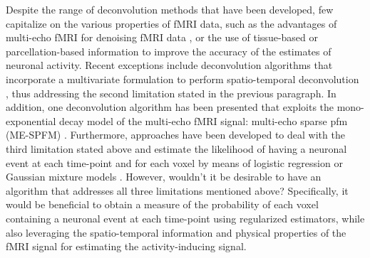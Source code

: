 Despite the range of deconvolution methods that have been developed, few
capitalize on the various properties of fMRI data, such as the advantages of
multi-echo fMRI for denoising fMRI data
\citep{Bright2013Removingmotionphysiological, Kundu2017MultiechofMRI}, or the
use of tissue-based or parcellation-based information to improve the accuracy of
the estimates of neuronal activity. Recent exceptions include deconvolution
algorithms that incorporate a multivariate formulation to perform
spatio-temporal deconvolution
\citep{Bolton2019StructurallyInformedDeconvolution,Urunuela2021LowRankSparse,
Costantini2022Anisotropic4DFiltering,Cherkaoui2021Multivariatesemiblind}, thus
addressing the second limitation stated in the previous paragraph. In addition,
one deconvolution algorithm has been presented that exploits the
mono-exponential decay model of the multi-echo fMRI signal: multi-echo sparse
\acrlong*{pfm} (ME-SPFM) \citep{CaballeroGaudes2019deconvolutionalgorithmmulti}.
Furthermore, approaches have been developed to deal with the third limitation
stated above and estimate the likelihood of having a neuronal event at each
time-point and for each voxel by means of logistic regression
\citep{Bush2013Decodingneuralevents,Bush2015ImprovingprecisionfMRI} or Gaussian
mixture models \citep{Pidnebesna2019EstimatingSparseNeuronal}. However, wouldn't
it be desirable to have an algorithm that addresses all three limitations
mentioned above? Specifically, it would be beneficial to obtain a measure of the
probability of each voxel containing a neuronal event at each time-point using
regularized estimators, while also leveraging the spatio-temporal information
and physical properties of the fMRI signal for estimating the activity-inducing
signal.

